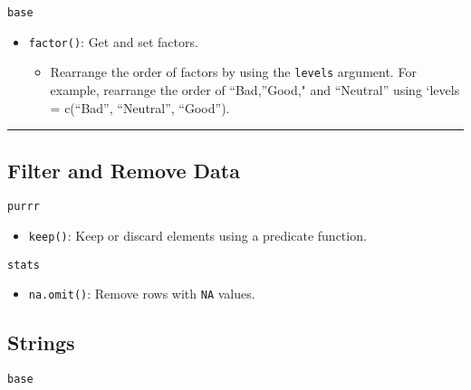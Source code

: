 \documentclass[]{book}
\providecommand{\tightlist}{%
  \setlength{\itemsep}{0pt}\setlength{\parskip}{0pt}}
\begin{document}
\texttt{base}

\begin{itemize}
\tightlist
\item
  \texttt{factor()}: Get and set factors.

  \begin{itemize}
  \tightlist
  \item
    Rearrange the order of factors by using the \texttt{levels} argument. For example, rearrange the order of ``Bad,''Good," and ``Neutral'' using `levels = c(``Bad'', ``Neutral'', ``Good'').
  \end{itemize}
\end{itemize}

\begin{center}\rule{0.5\linewidth}{\linethickness}\end{center}

\hypertarget{filter-and-remove-data}{%
\subsection{Filter and Remove Data}\label{filter-and-remove-data}}

\texttt{purrr}

\begin{itemize}
\tightlist
\item
  \texttt{keep()}: Keep or discard elements using a predicate function.
\end{itemize}

\texttt{stats}

\begin{itemize}
\tightlist
\item
  \texttt{na.omit()}: Remove rows with \texttt{NA} values.
\end{itemize}

\hypertarget{strings}{%
\subsection{Strings}\label{strings}}

\texttt{base}
\end{document}
